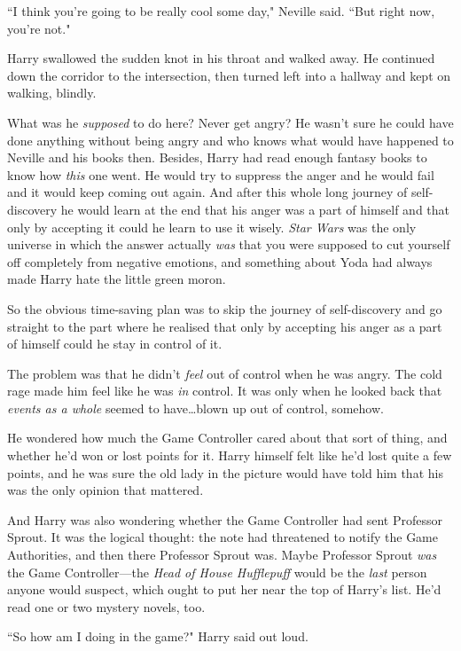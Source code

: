 ``I think you're going to be really cool some day," Neville said. ``But right now, you're not."

Harry swallowed the sudden knot in his throat and walked away. He continued down the corridor to the intersection, then turned left into a hallway and kept on walking, blindly.

What was he \emph{supposed} to do here? Never get angry? He wasn't sure he could have done anything without being angry and who knows what would have happened to Neville and his books then. Besides, Harry had read enough fantasy books to know how \emph{this} one went. He would try to suppress the anger and he would fail and it would keep coming out again. And after this whole long journey of self-discovery he would learn at the end that his anger was a part of himself and that only by accepting it could he learn to use it wisely. \emph{Star Wars} was the only universe in which the answer actually \emph{was} that you were supposed to cut yourself off completely from negative emotions, and something about Yoda had always made Harry hate the little green moron.

So the obvious time-saving plan was to skip the journey of self-discovery and go straight to the part where he realised that only by accepting his anger as a part of himself could he stay in control of it.

The problem was that he didn't \emph{feel} out of control when he was angry. The cold rage made him feel like he was \emph{in} control. It was only when he looked back that \emph{events as a whole} seemed to have…blown up out of control, somehow.

He wondered how much the Game Controller cared about that sort of thing, and whether he'd won or lost points for it. Harry himself felt like he'd lost quite a few points, and he was sure the old lady in the picture would have told him that his was the only opinion that mattered.

And Harry was also wondering whether the Game Controller had sent Professor Sprout. It was the logical thought: the note had threatened to notify the Game Authorities, and then there Professor Sprout was. Maybe Professor Sprout \emph{was} the Game Controller—the \emph{Head of House Hufflepuff} would be the \emph{last} person anyone would suspect, which ought to put her near the top of Harry's list. He'd read one or two mystery novels, too.

``So how am I doing in the game?" Harry said out loud.

